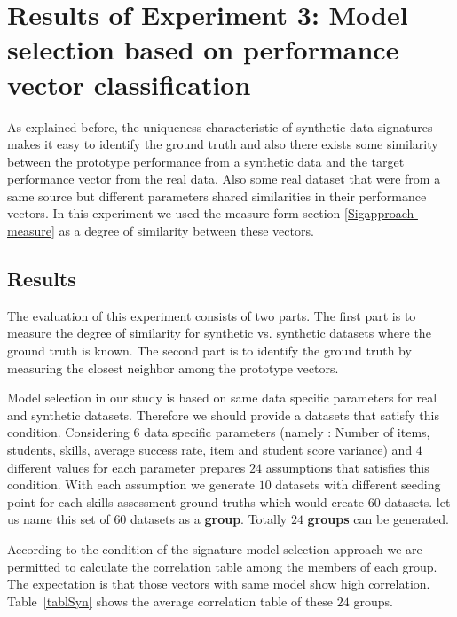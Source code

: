 
\section{Results of Experiment 3: Model selection based on performance vector classification}
 
As explained before, the uniqueness characteristic of synthetic data signatures makes it easy to identify the ground truth and also there exists some similarity between the prototype performance from a synthetic data and the target performance vector from the real data. Also some real dataset that were from a same source but different parameters shared similarities in their performance vectors. In this experiment we used the measure form section \ref{Sigapproach-measure} as a degree of similarity between these vectors.

\subsection{Results}


The evaluation of this experiment consists of two parts. The first part is to measure the degree of similarity for synthetic vs. synthetic datasets where the ground truth is known. The second part is to identify the ground truth by measuring the closest neighbor among the prototype vectors.



Model selection in our study is based on same data specific parameters for real and synthetic datasets. Therefore we should provide a datasets that satisfy this condition. Considering $6$ data specific parameters (namely : Number of items, students, skills, average success rate, item and student score variance) and $4$ different values for each parameter prepares $24$ assumptions that satisfies this condition. With each assumption we generate $10$ datasets with different seeding point for each skills assessment ground truths which would create $60$ datasets. let us name this set of $60$ datasets as a \textbf{group}. Totally $24$ \textbf{groups} can be generated.

According to the condition of the signature model selection approach we are permitted to calculate the correlation table among the members of each group. The expectation is that those vectors with same model show high correlation. Table~\ref{tablSyn} shows the average correlation table of these $24$ groups.


